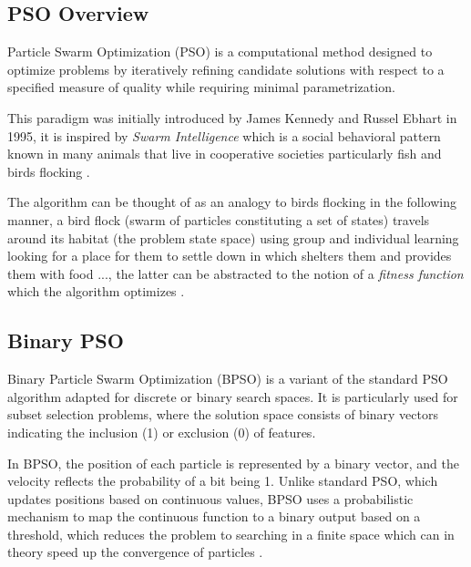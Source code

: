 \documentclass[12pt]{article}
\begin{document}
\subsection{PSO Overview}
Particle Swarm Optimization (PSO) is a computational method designed to optimize problems by iteratively refining candidate solutions with respect to a specified measure of quality while requiring minimal parametrization\cite{pereira2011pso}.

This paradigm was initially introduced by James Kennedy and Russel Ebhart in 1995\cite{pereira2011pso}, it is inspired by \textit{Swarm Intelligence} which is a social behavioral pattern known in many animals that live in cooperative societies particularly fish and birds flocking \cite{ChengS2018swarm}.

The algorithm can be thought of as an analogy to birds flocking in the following manner, a bird flock (swarm of particles constituting a set of states) travels around its habitat (the problem state space) using group and individual learning looking for a place for them to settle down in which shelters them and provides them with food ..., the latter can be abstracted to the notion of a \textit{fitness function} which the algorithm optimizes \cite{sengupta2018}.

\subsection{Binary PSO}

Binary Particle Swarm Optimization (BPSO) is a variant of the standard PSO algorithm adapted for discrete or binary search spaces. It is particularly used for subset selection problems, where the solution space consists of binary vectors indicating the inclusion (1) or exclusion (0) of features.

In BPSO, the position of each particle is represented by a binary vector, and the velocity reflects the probability of a bit being 1. Unlike standard PSO, which updates positions based on continuous values, BPSO uses a probabilistic mechanism to map the continuous function to a binary output based on a threshold, which reduces the problem to searching in a finite space which can in theory speed up the convergence of particles \cite{zain2014bpso}.
\end{document}
